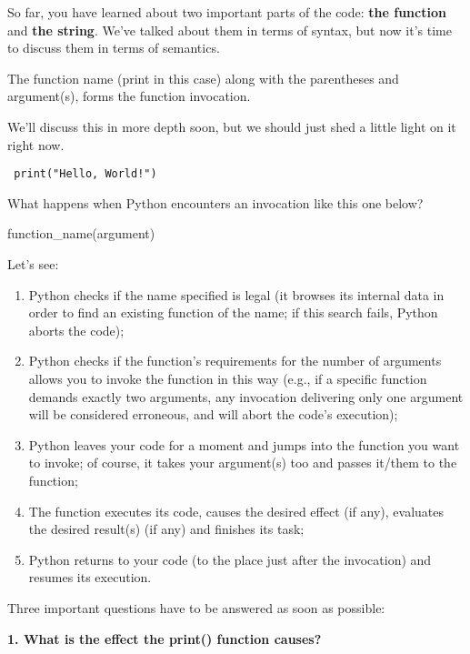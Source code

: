\documentclass[a4paper,10pt]{article}
\begin{document}
So far, you have learned about two important parts of the code: \textbf{the function} and \textbf{the string}. We've talked about them in terms of syntax, but now it's time to discuss them in terms of semantics.
\newline

The function name (print in this case) along with the parentheses and argument(s), forms the function invocation.
\newline

We'll discuss this in more depth soon, but we should just shed a little light on it right now.
\begin{verbatim}
 print("Hello, World!")
\end{verbatim}

What happens when Python encounters an invocation like this one below?
\newline

{\selectfont function\_name(argument)}
\newline

Let's see:
\begin{enumerate}
 \item Python checks if the name specified is legal (it browses its internal data in order to find an existing function of the name; if this search fails, Python aborts the code);
 \item Python checks if the function's requirements for the number of arguments allows you to invoke the function in this way (e.g., if a specific function demands exactly two arguments, any invocation delivering only one argument will be considered erroneous, and will abort the code's execution);
 \item Python leaves your code for a moment and jumps into the function you want to invoke; of course, it takes your argument(s) too and passes it/them to the function;
 \item The function executes its code, causes the desired effect (if any), evaluates the desired result(s) (if any) and finishes its task;
 \item Python returns to your code (to the place just after the invocation) and resumes its execution.
\end{enumerate}

Three important questions have to be answered as soon as possible:
\newline

\textbf{1. What is the effect the {\selectfont print()} function causes?}
\newline
\end{document}
